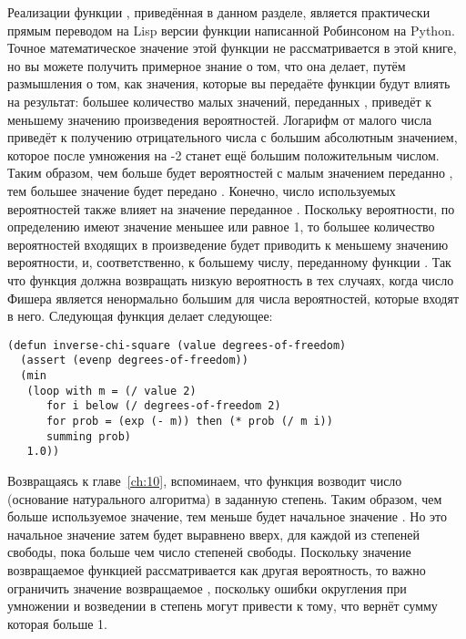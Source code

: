 Реализации функции , приведённая в данном разделе, является
практически прямым переводом на Lisp версии функции написанной Робинсоном на Python.
Точное математическое значение этой функции не рассматривается в этой книге, но вы можете
получить примерное знание о том, что она делает, путём размышления о том, как значения,
которые вы передаёте функции  будут влиять на результат: большее количество
малых значений, переданных , приведёт к меньшему значению произведения
вероятностей.  Логарифм от малого числа приведёт к получению отрицательного числа с
большим абсолютным значением, которое после умножения на -2 станет ещё большим
положительным числом.  Таким образом, чем больше будет вероятностей с малым значением
переданно , тем большее значение будет передано
. Конечно, число используемых вероятностей также влияет на
значение переданное .  Поскольку вероятности, по определению
имеют значение меньшее или равное 1, то большее количество вероятностей входящих в
произведение будет приводить к меньшему значению вероятности, и, соответственно, к
большему числу, переданному функции .  Так что функция
 должна возвращать низкую вероятность в тех случаях, когда число
Фишера является ненормально большим для числа вероятностей, которые входят в него.
Следующая функция делает следующее:

\begin{lstlisting}
(defun inverse-chi-square (value degrees-of-freedom)
  (assert (evenp degrees-of-freedom))
  (min 
   (loop with m = (/ value 2)
      for i below (/ degrees-of-freedom 2)
      for prob = (exp (- m)) then (* prob (/ m i))
      summing prob)
   1.0))
\end{lstlisting}

Возвращаясь к главе~\ref{ch:10}, вспоминаем, что функция  возводит число
 (основание натурального алгоритма) в заданную степень.  Таким образом, чем больше
используемое значение, тем меньше будет начальное значение .  Но это начальное
значение затем будет выравнено вверх, для каждой из степеней свободы, пока  больше
чем число степеней свободы.  Поскольку значение возвращаемое функцией
 рассматривается как другая вероятность, то важно ограничить
значение возвращаемое , поскольку ошибки округления при умножении и возведении в
степень могут привести к тому, что  вернёт сумму которая больше 1.

